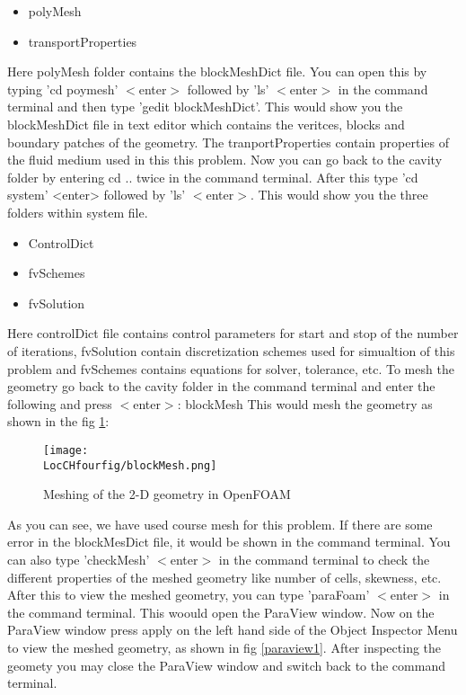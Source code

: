 \begin{itemize}
  \item polyMesh
  \item transportProperties
\end{itemize}

\flushleft Here polyMesh folder contains the blockMeshDict file. You can open this by typing 'cd poymesh' $<$enter$>$ followed by 'ls' $<$enter$>$ in the command terminal and then type 'gedit blockMeshDict'. This would show you the blockMeshDict file in text editor which contains the veritces, blocks and boundary patches of the geometry. The tranportProperties contain properties of the fluid medium used in this this problem. 
\flushleft Now you can go back to the cavity folder by entering cd .. twice in the command terminal. After this type 'cd system' <enter> followed by 'ls' $<$enter$>$. This would show you the three folders within system file.
\begin{itemize}
  \item ControlDict
  \item fvSchemes
  \item fvSolution
\end{itemize}

\flushleft Here controlDict file contains control parameters for start and stop of the number of iterations, fvSolution contain discretization schemes used for simualtion of this problem and fvSchemes contains equations for solver, tolerance, etc.
\flushleft To mesh the geometry go back to the cavity folder in the command terminal and enter the following and press $<$enter$>$:
\flushleft blockMesh
\flushleft This would mesh the geometry as shown in the fig \ref{blockmesh}$:$

\begin{figure}[ht]  
\begin{center}  
\texttt{[image: \\LocCHfourfig/blockMesh.png]}
\caption{Meshing of the 2-D geometry in OpenFOAM}
\label{blockmesh}
\end{center}  
\end{figure}

\flushleft As you can see, we have used course mesh for this problem. If there are some error in the blockMesDict file, it would be shown in the command terminal. You can also type 'checkMesh' $<$enter$>$ in the command terminal to check the different properties of the meshed geometry like number of cells, skewness, etc. 
\flushleft After this to view the meshed geometry, you can type 'paraFoam' $<$enter$>$ in the command terminal. This woould open the ParaView window. Now on the ParaView window press apply on the left hand side of the Object Inspector Menu to view the meshed geometry, as shown in fig \ref{paraview1}. After inspecting the geomety you may close the ParaView window and switch back to the command terminal.

